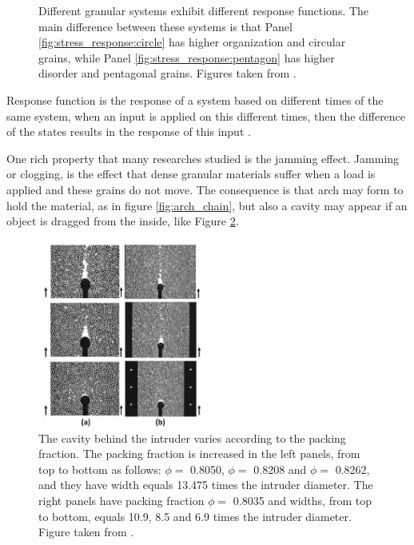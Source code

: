 \begin{figure}[H]
\begin{minipage}{.45\linewidth}
        \label{fig:stress_response:pentagon}
    \end{minipage}
    \caption[Stress response in ordered/disordered granular packings.]{Different granular systems exhibit different response functions. The main difference between these systems is that Panel \ref{fig:stress_response:circle} has higher organization and circular grains, while Panel \ref{fig:stress_response:pentagon} has higher disorder and pentagonal grains. Figures taken from \cite{Sensitivity_of_Stress_Response_Function_to_Packing_Preparation}.}
    \label{fig:stress_response}
\end{figure}

    Response function is the response of a system based on different times of the same system, when an input is applied on this different times, then the difference of the states results in the response of this input \cite{The_Physics_of_Granular_Media}.

    One rich property that many researches studied \cite{Caio-Tese, Felipe-Tese, Eduardo-Tese, Non-Gaussian_behavior_in_jamming_unjamming_transition_in_dense_granular_materials, Da_Cruz-Tese} is the jamming effect. Jamming or clogging, is the effect that dense granular materials suffer when a load is applied and these grains do not move. The consequence is that arch may form to hold the material, as in figure \ref{fig:arch_chain}, but also a cavity may appear if an object is dragged from the inside, like Figure \ref{fig:box_Kolb}.

\begin{figure}[H]
    \centering
    \includegraphics[width=0.5\textwidth]{04-figuras/box_Kolb.png}
    \caption[Cavity formed by a fixed intruder in a dense granular packing.]{The cavity behind the intruder varies according to the packing fraction. The packing fraction is increased in the left panels, from top to bottom as follows: $\phi=$ 0.8050, $\phi=$ 0.8208 and $\phi=$ 0.8262, and they have width equals 13.475 times the intruder diameter. The right panels have packing fraction $\phi=$ 0.8035 and widths, from top to bottom, equals 10.9, 8.5 and 6.9 times the intruder diameter. Figure taken from \cite{Jamming_and_unjamming_by_penetration_of_a_cylindrical_intruder}.}
    \label{fig:box_Kolb}
\end{figure}

